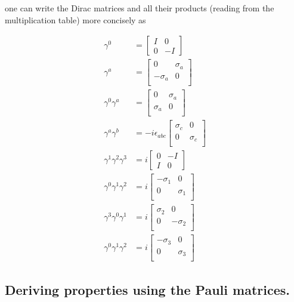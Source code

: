 \documentclass{article}
\begin{document}
one can write the Dirac matrices and all their products (reading from the multiplication table) more concisely as

\begin{align}
\gamma^0 &= 
\begin{bmatrix}
I & 0 \\
0 & -I
\end{bmatrix} \\
\gamma^a &= 
\begin{bmatrix}
0 & \sigma_a \\
-\sigma_a & 0 \\
\end{bmatrix} \\
\gamma^0 \gamma^a &=
\begin{bmatrix}
0 & \sigma_a \\
\sigma_a & 0 \\
\end{bmatrix} \\
\gamma^a \gamma^b &=
- i \epsilon_{a b c}
\begin{bmatrix}
\sigma_c & 0 \\
0 & \sigma_c \\
\end{bmatrix} \\
\gamma^1 \gamma^2 \gamma^3 &= i 
\begin{bmatrix}
0 & -I \\
I & 0
\end{bmatrix} \\
\gamma^0 \gamma^1 \gamma^2 &= i 
\begin{bmatrix}
-\sigma_1 & 0 \\
0 & \sigma_1 \\
\end{bmatrix} \\
\gamma^3 \gamma^0 \gamma^1 &= i 
\begin{bmatrix}
\sigma_2 & 0 \\
0 & -\sigma_2 \\
\end{bmatrix} \\
\gamma^0 \gamma^1 \gamma^2 &= i 
\begin{bmatrix}
-\sigma_3 & 0 \\
0 & \sigma_3 \\
\end{bmatrix}
\end{align}

\subsection{ Deriving properties using the Pauli matrices. }
\end{document}
